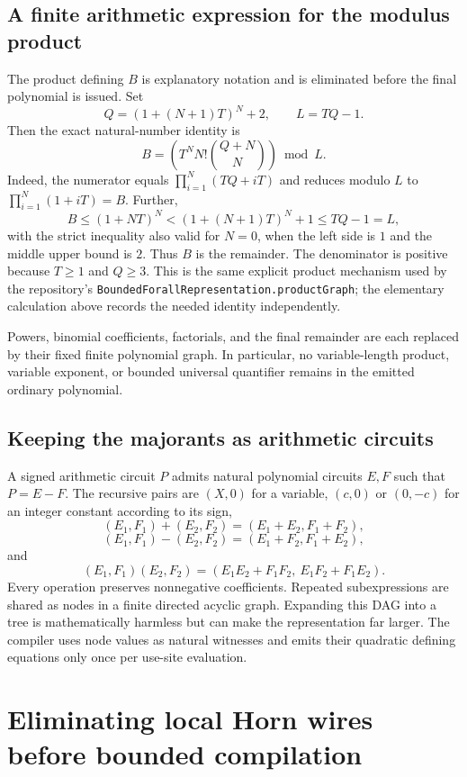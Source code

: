 \subsection{A finite arithmetic expression for the modulus product}

The product defining $B$ is explanatory notation and is eliminated before
the final polynomial is issued.  Set
\[
 Q=(1+(N+1)T)^N+2,\qquad L=TQ-1.
\]
Then the exact natural-number identity is
\begin{equation}
 \label{eq:product-expression}
 B=\left(T^N N!\binom{Q+N}{N}\right)\bmod L.
\end{equation}
Indeed, the numerator equals
$\prod_{i=1}^N(TQ+iT)$ and reduces modulo $L$ to
$\prod_{i=1}^N(1+iT)=B$.  Further,
\[
 B\le(1+NT)^N<(1+(N+1)T)^N+1\le TQ-1=L,
\]
with the strict inequality also valid for $N=0$, when the left side is
$1$ and the middle upper bound is $2$.  Thus $B$ is the remainder.
The denominator is positive because $T\ge1$ and $Q\ge3$.
This is the same explicit product mechanism used by the repository's
\nolinkurl{BoundedForallRepresentation.productGraph}; the elementary
calculation above records the needed identity independently.

Powers, binomial coefficients, factorials, and the final remainder are each
replaced by their fixed finite polynomial graph.  In particular, no
variable-length product, variable exponent, or bounded universal quantifier
remains in the emitted ordinary polynomial.

\subsection{Keeping the majorants as arithmetic circuits}

A signed arithmetic circuit $P$ admits natural polynomial circuits $E,F$
such that $P=E-F$.  The recursive pairs are $(X,0)$ for a variable,
$(c,0)$ or $(0,-c)$ for an integer constant according to its sign,
\[
 (E_1,F_1)+(E_2,F_2)=(E_1+E_2,F_1+F_2),
\]
\[
 (E_1,F_1)-(E_2,F_2)=(E_1+F_2,F_1+E_2),
\]
and
\[
 (E_1,F_1)(E_2,F_2)=
 (E_1E_2+F_1F_2,\ E_1F_2+F_1E_2).
\]
Every operation preserves nonnegative coefficients.  Repeated subexpressions
are shared as nodes in a finite directed acyclic graph.  Expanding this DAG
into a tree is mathematically harmless but can make the representation far
larger.  The compiler uses node values as natural witnesses and emits their
quadratic defining equations only once per use-site evaluation.

\section{Eliminating local Horn wires before bounded compilation}

